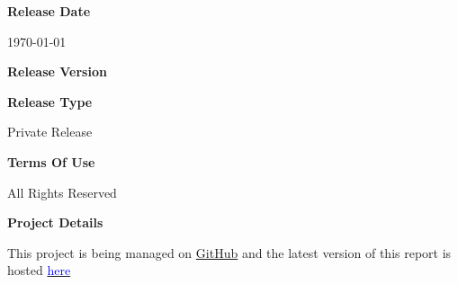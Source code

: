 \begin{titlepage}
{        \vspace{0.24cm}
        \textbf{\textcolor{tuberlindarkgray}{Release Date}}\par \vspace{0.12cm}
        {\today}

        \vspace{0.24cm}
        \textbf{\textcolor{tuberlindarkgray}{Release Version}}\par \vspace{0.12cm}
        \textbf{\hyperlink{Target_DocInfo}{}}\par
    \vspace{0.24cm}
        
        \textbf{\textcolor{tuberlindarkgray}{Release Type}}\par \vspace{0.12cm}
        {Private Release}

        \vspace{0.24cm}
        \textbf{\textcolor{tuberlindarkgray}{Terms Of Use}}\par \vspace{0.12cm}
        {All Rights Reserved}

        \vspace{0.24cm}
        \textbf{\textcolor{tuberlindarkgray}{Project Details}}\par \vspace{0.12cm}
        {This project is being managed on \href{https://github.com/ELP305-Cleaning-Machine}{GitHub} and the latest version of this report is hosted \href{https://2nav.github.io/TribeC/}{\textcolor{blue}{here}}}
    }
\end{titlepage}
\afterpage{\restoregeometry}